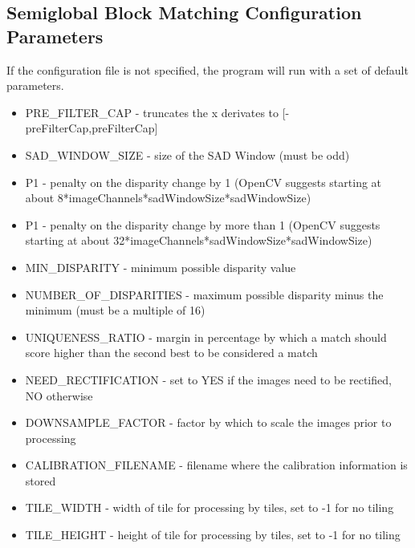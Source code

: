 \subsection{Semiglobal Block Matching Configuration Parameters}
If the configuration file is not specified, the program will run with a set of default parameters.
\begin{itemize}
	\item{\textsc{PRE\_FILTER\_CAP }} - truncates the x derivates to [-preFilterCap,preFilterCap]
	\item{\textsc{SAD\_WINDOW\_SIZE} - size of the SAD Window (must be odd)}
	\item{\textsc{P1} - penalty on the disparity change by 1 (OpenCV suggests starting at about 8*imageChannels*sadWindowSize*sadWindowSize)}
	\item{\textsc{P1} - penalty on the disparity change by more than 1 (OpenCV suggests starting at about 32*imageChannels*sadWindowSize*sadWindowSize)}
   \item{\textsc{MIN\_DISPARITY} - minimum possible disparity value}
   \item{\textsc{NUMBER\_OF\_DISPARITIES} - maximum possible disparity minus the minimum (must be a multiple of 16)} 
   \item{\textsc{UNIQUENESS\_RATIO} - margin in percentage by which a match should score higher than the second best to be considered a match}
   \item{\textsc{NEED\_RECTIFICATION} - set to YES if the images need to be rectified, NO otherwise}
   \item{\textsc{DOWNSAMPLE\_FACTOR} - factor by which to scale the images prior to processing}
   \item{\textsc{CALIBRATION\_FILENAME} - filename where the calibration information is stored}
   \item{\textsc{TILE\_WIDTH} - width of tile for processing by tiles, set to -1 for no tiling}
   \item{\textsc{TILE\_HEIGHT} - height of tile for processing by tiles, set to -1 for no tiling}
\end{itemize}


